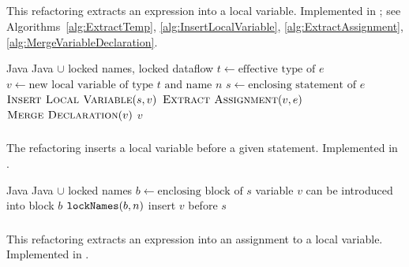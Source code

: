\subsection{}
This refactoring extracts an expression into a local variable. Implemented in ; see Algorithms~\ref{alg:ExtractTemp}, \ref{alg:InsertLocalVariable}, \ref{alg:ExtractAssignment}, \ref{alg:MergeVariableDeclaration}.

\begin{algorithm}
\caption{$\refactoring{Extract Temp}(e : \type{Expr}, n : \type{Name}) : LocalVar$}
\label{alg:ExtractTemp}
\begin{algorithmic}[1]
\REQUIRE Java
\ENSURE Java $\cup$ locked names, locked dataflow
\medskip
\STATE $t \leftarrow \text{effective type of $e$}$
\STATE $v \leftarrow \text{new local variable of type $t$ and name $n$}$
\STATE $s \leftarrow \text{enclosing statement of $e$}$
\STATE $\textsc{Insert Local Variable}(s, v)$
\STATE $\textsc{Extract Assignment}(v, e)$
\STATE $\textsc{Merge Declaration}(v)$
\RETURN $v$
\end{algorithmic}
\end{algorithm}

\subsubsection{}
The refactoring inserts a local variable before a given statement. Implemented in .

\begin{algorithm}
\caption{$\refactoring{Insert Local Variable}(s : \type{Stmt}, v : \type{LocalVar}$)}
\label{alg:InsertLocalVariable}
\begin{algorithmic}[1]
\REQUIRE Java
\ENSURE Java $\cup$ locked names
\medskip
\STATE $b \leftarrow \text{enclosing block of $s$}$
\STATE \assert variable $v$ can be introduced into block $b$
\STATE $\text{\texttt{lockNames}}(b, n)$
\STATE insert $v$ before $s$
\end{algorithmic}
\end{algorithm}

\subsubsection{}
This refactoring extracts an expression into an assignment to a local variable. Implemented in .

